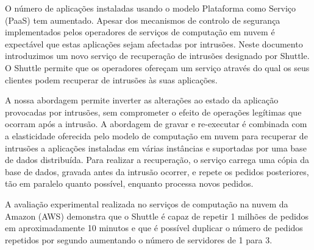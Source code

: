 
\begin{resumo}
O número de aplicações instaladas usando o modelo Plataforma como Serviço (PaaS) tem aumentado. Apesar dos mecanismos de controlo de segurança implementados pelos operadores de serviços de computação em nuvem é expectável que estas aplicações sejam afectadas por intrusões. Neste documento introduzimos um novo serviço de recuperação de intrusões designado por Shuttle. O Shuttle permite que os operadores ofereçam um serviço através do qual os seus clientes podem recuperar de intrusões às suas aplicações.

A nossa abordagem permite inverter as alterações ao estado da aplicação provocadas por intrusões, sem comprometer o efeito de operações legítimas que ocorram após a intrusão. A abordagem de gravar e re-executar é combinada com a elasticidade oferecida pelo modelo de computação em nuvem para recuperar de intrusões a aplicações instaladas em várias instâncias e suportadas por uma base de dados distribuída. Para realizar a recuperação, o serviço carrega uma cópia da base de dados, gravada antes da intrusão ocorrer, e repete os pedidos posteriores, tão em paralelo quanto possível, enquanto processa novos pedidos.

A avaliação experimental realizada no serviços de computação na nuvem da Amazon (AWS) demonstra que o Shuttle é capaz de repetir 1 milhões de pedidos em aproximadamente 10 minutos e que é possível duplicar o número de pedidos repetidos por segundo aumentando o número de servidores de 1 para 3.



\end{resumo}
